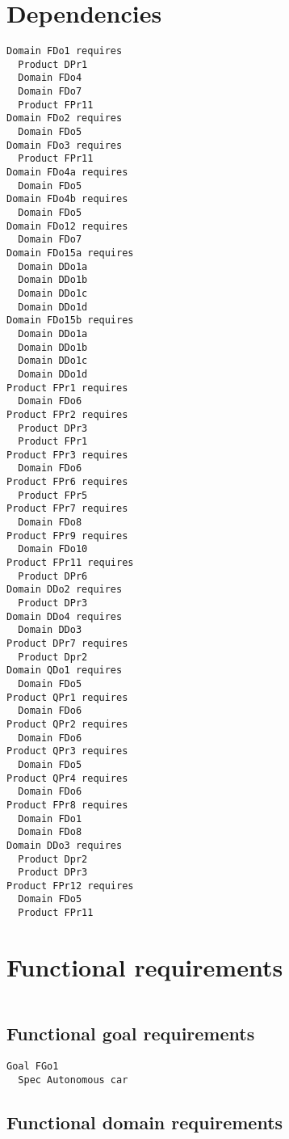 \section{Dependencies}

\begin{lstlisting}
Domain FDo1 requires
  Product DPr1
  Domain FDo4
  Domain FDo7
  Product FPr11
Domain FDo2 requires
  Domain FDo5
Domain FDo3 requires
  Product FPr11
Domain FDo4a requires
  Domain FDo5
Domain FDo4b requires
  Domain FDo5
Domain FDo12 requires
  Domain FDo7
Domain FDo15a requires
  Domain DDo1a
  Domain DDo1b
  Domain DDo1c
  Domain DDo1d
Domain FDo15b requires
  Domain DDo1a
  Domain DDo1b
  Domain DDo1c
  Domain DDo1d
Product FPr1 requires
  Domain FDo6
Product FPr2 requires
  Product DPr3
  Product FPr1
Product FPr3 requires
  Domain FDo6
Product FPr6 requires
  Product FPr5
Product FPr7 requires
  Domain FDo8
Product FPr9 requires
  Domain FDo10
Product FPr11 requires
  Product DPr6
Domain DDo2 requires
  Product DPr3
Domain DDo4 requires
  Domain DDo3
Product DPr7 requires
  Product Dpr2
Domain QDo1 requires
  Domain FDo5
Product QPr1 requires
  Domain FDo6
Product QPr2 requires
  Domain FDo6
Product QPr3 requires
  Domain FDo5
Product QPr4 requires
  Domain FDo6
Product FPr8 requires
  Domain FDo1
  Domain FDo8
Domain DDo3 requires
  Product Dpr2
  Product DPr3
Product FPr12 requires
  Domain FDo5
  Product FPr11

\end{lstlisting}


       \section{Functional requirements}


\begin{lstlisting}

\end{lstlisting}


       \subsection{Functional goal requirements}


\begin{lstlisting}
Goal FGo1
  Spec Autonomous car

\end{lstlisting}
    
        
       \subsection{Functional domain requirements}


